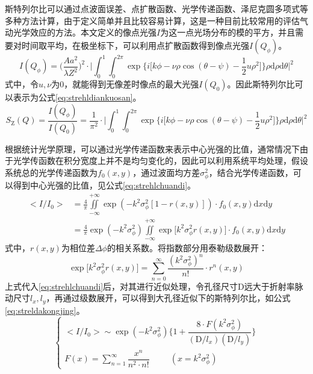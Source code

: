 斯特列尔比可以通过点波面误差、点扩散函数、光学传递函数、泽尼克圆多项式等多种方法计算，由于定义简单并且比较容易计算，这是一种目前比较常用的评估气动光学效应的方法。本文定义的像点光强$I$为这一点光场分布的模的平方，并且需要对时间取平均，在极坐标下，可以利用点扩散函数得到像点光强$I(Q_\phi)$。
\begin{equation}
I(Q_\phi)=\Big(\frac{Aa^2}{\lambda Z^2}\Big)^2\cdot\bigg\vert\int_0^1\int_0^{2\pi}\exp\Big\{i\big[k\phi-\nu\rho\cos(\theta-\psi)-\frac{1}{2}u\rho^2\big]\Big\}\rho\text{d}\rho\text{d}\theta\bigg\vert^2
\end{equation}
式中，令$u,\nu$为0，就能得到无像差时像点的最大光强$I(Q_0)$。因此斯特列尔比可以表示为公式\eqref{eq:strehldiankuosan}。
\begin{equation}
S_\text{Z}(Q)=\frac{I(Q_\phi)}{I(Q_0)}=\frac{1}{\pi^2}\cdot\bigg\vert\int_0^1\int_0^{2\pi}\exp\Big\{i\big[k\phi-\nu\rho\cos(\theta-\psi)-\frac{1}{2}u\rho^2\big]\Big\}\rho\text{d}\rho\text{d}\theta\bigg\vert^2
\label{eq:strehldiankuosan}
\end{equation}

根据统计光学原理，可以通过光学传递函数来表示中心光强的比值，通常情况下由于光学传函数在积分宽度上并不是均匀变化的，因此可以利用系统平均处理，假设系统总的光学传递函数为$f_0(x,y)$，通过波面均方差$\sigma_\phi^2$，结合光学传递函数，可以得到中心光强的比值，见公式\eqref{eq:strehlchuandi}。
\begin{equation}
\begin{aligned}
<I/I_0>&=\frac{4}{\pi}\iint\limits_{-\infty}^{+\infty}\exp(-k^2\sigma_\phi^2[1-r(x,y)])\cdot f_0(x,y)\text{d}x\text{d}y\\
&=\frac{4}{\pi}\exp(-k^2\sigma_\phi^2)\iint\limits_{-\infty}^{+\infty}\exp\big[k^2\sigma_\phi^2r(x,y)\big]\cdot f_0(x,y)\text{d}x\text{d}y
\end{aligned}
\label{eq:strehlchuandi}
\end{equation}
式中，$r(x,y)$为相位差$\Delta\phi$的相关系数。将指数部分用泰勒级数展开：
\begin{equation}
\exp\big[k^2\sigma_\phi^2r(x,y)\big]=\sum\limits_{n=0}^{\infty}\frac{(k^2\sigma_\phi^2)^n}{n!}\cdot r^n(x,y)
\end{equation}
上式代入\eqref{eq:strehlchuandi}后，对其进行近似处理，令孔径尺寸D远大于折射率脉动尺寸$l_x,l_y$，再通过级数展开，可以得到大孔径近似下的斯特列尔比，如公式\eqref{eq:streldakongjing}。
\begin{equation}
\begin{cases}
<I/I_0>\sim\exp(-k^2\sigma_\phi^2)\Big\{1+\dfrac{8\cdot F(k^2\sigma_\phi^2)}{(\text{D}/l_x)(\text{D}/l_y)}\Big\}\\
F(x)=\sum\limits_{n=1}^{\infty}\dfrac{x^n}{n^2\cdot n!}~~~~~~~~~~~(x=k^2\sigma_\phi^2)
\end{cases}
\label{eq:streldakongjing}
\end{equation}


